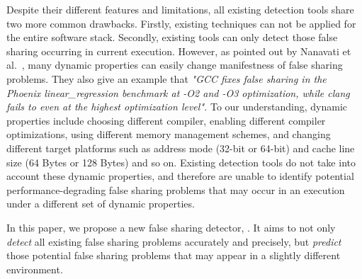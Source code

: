 Despite their different features and limitations, all existing detection tools 
share two more common drawbacks.
Firstly, existing techniques can not be applied for 
the entire software stack.
Secondly, existing tools can only detect those false sharing occurring in current execution.
However, as pointed out by Nanavati et al.~\cite{OSdetection}, 
many dynamic properties can easily change manifestness of false sharing problems.
They also give an example that 
{\it "GCC fixes false sharing in the Phoenix linear\_regression benchmark 
at -O2 and -O3 optimization, while clang fails to even at the highest
optimization level".}
To our understanding, dynamic properties include 
choosing different compiler, 
enabling different compiler optimizations, 
using different memory management schemes,
and changing different target platforms such as address mode (32-bit or 64-bit) and cache line
size (64 Bytes or 128 Bytes) and so on. 
Existing detection tools do not take into account these dynamic properties, and
therefore are unable to identify potential performance-degrading false
sharing problems that may occur in an execution under a different set of 
dynamic properties.

In this paper, we propose a new false sharing detector, \Predator{}.
It aims to not only {\it detect} all existing false sharing problems accurately and precisely,
but {\it predict} those potential 
false sharing problems that may appear in a slightly different environment. 

